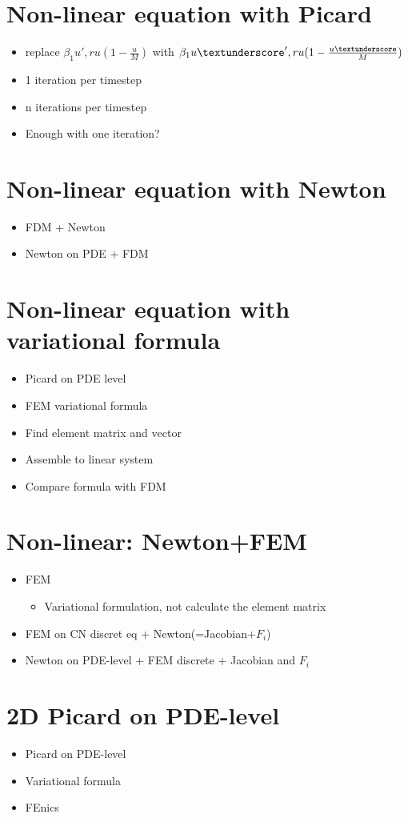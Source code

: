 \documentclass[norsk,11pt.a4paper]{article}
\begin{document}
\section{Non-linear equation with Picard}
\begin{itemize}
	\item replace $\beta_1 u', ru(1-\frac{u}{M})$ with $\beta_1 u\textunderscore', ru(1-\frac{u\textunderscore}{M})$
	\item 1 iteration per timestep
	\item n iterations per timestep
	\item Enough with one iteration? 
\end{itemize}
	

\section{Non-linear equation with Newton}
\begin{itemize}
	\item FDM + Newton
	\item Newton on PDE + FDM
\end{itemize}

\section{Non-linear equation with variational formula}
\begin{itemize}
	\item Picard on PDE level
	\item FEM variational formula
	\item Find element matrix and vector
	\item Assemble to linear system
	\item Compare formula with FDM
\end{itemize}

\section{Non-linear: Newton+FEM}
\begin{itemize}
	\item FEM
	\begin{itemize}
		\item Variational formulation, not calculate the element matrix
	\end{itemize}
	\item FEM on CN discret eq + Newton(=Jacobian+$F_i$)
	\item Newton on PDE-level + FEM discrete + Jacobian and $F_i$
\end{itemize}


\section{2D Picard on PDE-level}

\begin{itemize}
	\item Picard on PDE-level
	\item Variational formula
	\item FEnics
\end{itemize}
\end{document}
